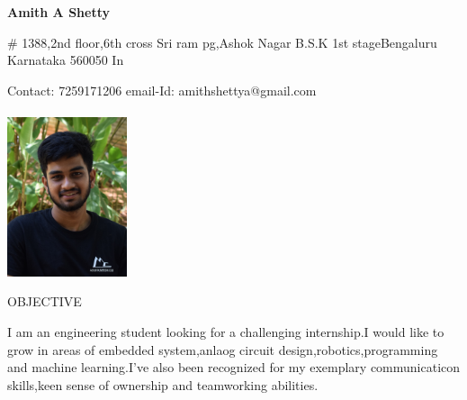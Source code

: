 \documentclass[10pt]{article}
\begin{document}
	

	
	\begin{center}
		\bfseries{\large Amith A Shetty}
	\end{center}


	\noindent\makebox[\linewidth]{\rule{\textwidth}{1.8pt}}
	
	


		\begin{minipage}[t][6cm][t]{0.7\textwidth}
		   \# 1388,2nd floor,6th cross  
			\newline  Sri ram pg,Ashok Nagar   
			\newline  B.S.K 1st stageBengaluru 
			\newline  Karnataka 560050
			\newline  In
			
	    \end{minipage}
		\begin{minipage}[t][6cm][t]{0.3\textwidth}
		
		  Contact: 7259171206 
		  \newline email-Id: amithshettya@gmail.com
		  \\ \\
			\newline \includegraphics[width=100pt]{amith_profile.JPG}
		\end{minipage}

	

	
	\vspace{5em}
	
		\begin{minipage}[t][2cm][t]{0.2\textwidth}
		OBJECTIVE
		
	\end{minipage}
	\begin{minipage}[t][2cm][t]{0.8\textwidth}
		I am an engineering student looking for a challenging internship.I would like to grow in areas of embedded system,anlaog circuit design,robotics,programming and machine learning.I've also been recognized for my exemplary communicaticon skills,keen sense of ownership and teamworking abilities.
		
	\end{minipage}
	
\end{document}
